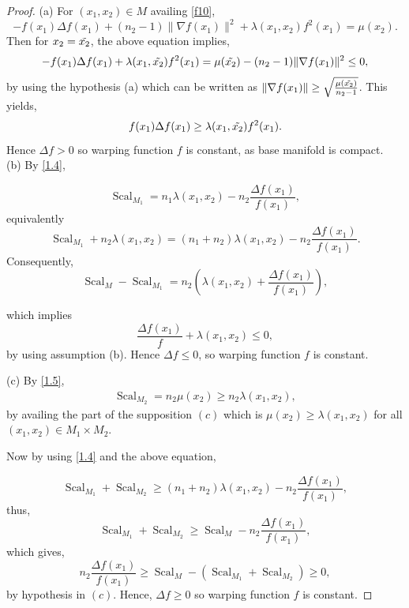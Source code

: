 \documentclass[pdflatex,sn-mathphys-num]{sn-jnl}%
\theoremstyle{thmstyleone}%
\theoremstyle{thmstyletwo}%
\theoremstyle{thmstylethree}%
\begin{document}
\begin{proof}
	{(a)} For $(x_1, x_2) \in M$ availing \eqref{f10},
	\begin{equation*}
		-f(x_1)\Delta f(x_1) + (n_2-1)\|\nabla f(x_1)\|^2+ \lambda(x_1,x_2)f^2(x_1)=\mu (x_2). 
	\end{equation*}
Then for $x_2=\Tilde{x_2}$, the above equation implies,
     \begin{equation*}
     	-f(x_1)\Delta f(x_1) + \lambda(x_1,\Tilde{x_2})f^2(x_1)=\mu (\Tilde{x_2})-(n_2-1)\|\nabla f(x_1)\|^2\leq 0,
     \end{equation*} 
 by using the hypothesis (a) which can be written as $\|\nabla f(x_1)\|\geq \sqrt{\frac{\mu(\Tilde{x_2})}{n_2-1}}$. This yields,
 \begin{equation*}
 	f(x_1)\Delta f(x_1)\geq \lambda(x_1,\Tilde{x_2})f^2(x_1).
 \end{equation*}
 Hence $\Delta f>0$ so warping function $f$ is constant, as base manifold is compact. \\
 
 
 
 { (b)} By \eqref{1.4},
 
 	$$\operatorname{Scal}_{M_1}= n_1\lambda(x_1,x_2)-n_2\frac{\Delta f(x_1)}{f(x_1)},$$
  equivalently
 	$$ \operatorname{Scal}_{M_1}+n_2\lambda(x_1,x_2)=(n_1+n_2)\lambda(x_1,x_2)-n_2\frac{\Delta f(x_1)}{f(x_1)}.$$
Consequently,
 	$$\operatorname{Scal}_{M}-\operatorname{Scal}_{M_1}=n_2\left(\lambda(x_1,x_2)+\frac{\Delta f(x_1)}{f(x_1)}\right),$$
 
which implies
$$\dfrac{\Delta f(x_1)}{f}+ \lambda(x_1,x_2)\leq 0,$$ 
by using assumption (b).
Hence $\Delta f \leq 0$, so warping function $f$ is constant.\newline
 
 {(c)} By \eqref{1.5},
 \begin{align*}
 	\operatorname{Scal}_{M_2}=n_2\mu(x_2) \geq n_2 \lambda(x_1,x_2),
 \end{align*}
by availing the part of the supposition $(c)$ which is $\mu(x_2)\geq\lambda(x_1,x_2)$ for all $(x_1,x_2)\in M_1\times M_2$.
 
Now by using \eqref{1.4} and the above equation,

	$$\operatorname{Scal}_{M_1}+ \operatorname{Scal}_{M_2}\geq (n_1+n_2)\lambda(x_1,x_2)-n_2 \frac{\Delta f(x_1)}{f(x_1)},$$
 thus,
	$$\operatorname{Scal}_{M_1}+ \operatorname{Scal}_{M_2}\geq \operatorname{Scal}_M-n_2 \frac{\Delta f(x_1)}{f(x_1)},$$
 which gives,   
 $$n_2 \frac{\Delta f(x_1)}{f(x_1)}	\geq \operatorname{Scal}_M -(\operatorname{Scal}_{M_1}+\operatorname{Scal}_{M_2})\geq 0,$$
by hypothesis in $(c)$. 
Hence, $\Delta f\geq0$ so warping function $f$ is constant.\newline
 

\end{proof}
\end{document}
